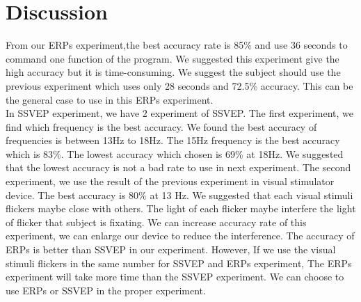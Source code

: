 \section{Discussion}
\hspace{1.5cm} From our ERPs experiment,the best accuracy rate is 85\% and use 36 seconds to command one function of the program. We suggested this experiment give the high accuracy but it is time-consuming. We suggest the subject should use the previous experiment which uses only 28 seconds and 72.5\% accuracy. This can be the general case to use in this ERPs experiment.\\
\hspace{1.5cm} In SSVEP experiment, we have 2 experiment of SSVEP. The first experiment, we find which frequency is the best accuracy. We found the best accuracy of frequencies is between 13Hz to  18Hz. The 15Hz frequency is the best accuracy which is 83\%. The lowest accuracy which chosen is 69\% at 18Hz. We suggested that the lowest accuracy is not a bad rate  to use in next experiment. The second experiment, we use the result of the previous experiment in visual stimulator device. The best accuracy is 80\% at 13 Hz. We suggested that each visual stimuli flickers maybe close with others. The light of each flicker maybe interfere the light of flicker that subject is fixating. We can increase accuracy rate of this experiment, we can enlarge our device to reduce the interference. The accuracy of ERPs is better than SSVEP in our experiment. However, If we use the visual stimuli flickers in the same number for SSVEP and ERPs experiment, The ERPs experiment will take more time than the SSVEP experiment. We can choose to use ERPs or SSVEP in the proper experiment.

